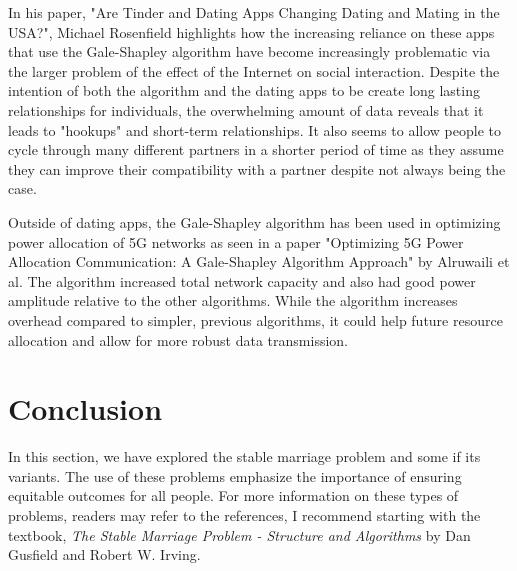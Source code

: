 In his paper, "Are Tinder and Dating Apps Changing Dating and Mating in the USA?", Michael Rosenfield highlights how the increasing reliance on these apps that use the Gale-Shapley algorithm have become increasingly problematic via the larger problem of the effect of the Internet on social interaction. Despite the intention of both the algorithm and the dating apps to be create long lasting relationships for individuals, the overwhelming amount of data reveals that it leads to "hookups" and short-term relationships. It also seems to allow people to cycle through many different partners in a shorter period of time as they assume they can improve their compatibility with a partner despite not always being the case. \cite{Rosenfeld2018}

Outside of dating apps, the Gale-Shapley algorithm has been used in optimizing power allocation of 5G networks as seen in a paper "Optimizing 5G Power Allocation Communication: A Gale-Shapley Algorithm Approach" by Alruwaili et al. The algorithm increased total network capacity and also had good power amplitude relative to the other algorithms. While the algorithm increases overhead compared to simpler, previous algorithms, it could help future resource allocation and allow for more robust data transmission. \cite{10443942}

\section*{Conclusion}
In this section, we have explored the stable marriage problem and some if its variants. The use of these problems emphasize the importance of ensuring equitable outcomes for all people. For more information on these types of problems, readers may refer to the references, I recommend starting with the textbook, \emph{The Stable Marriage Problem - Structure and Algorithms} by Dan Gusfield and Robert W. Irving.

\nocite{mcvitie}
\nocite{popmatch}
\nocite{RONN1990285}
\nocite{wiki}
